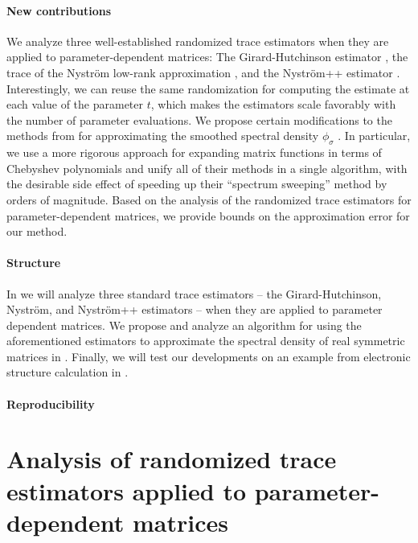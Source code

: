 \documentclass[12pt]{article}
\begin{document}
\paragraph{New contributions} We analyze three well-established randomized trace estimators when they are applied to parameter-dependent matrices: The Girard-Hutchinson estimator \cite{girard-1989-fast-montecarlo, hutchinson-1990-stochastic-estimator}, the trace of the Nyström low-rank approximation \cite{gittens-2013-revisiting-nystrom}, and the Nyström++ estimator \cite{persson-2022-improved-variants}. Interestingly, we can reuse the same randomization for computing the estimate at each value of the parameter $t$, which makes the estimators scale favorably with the number of parameter evaluations. We propose certain modifications to the methods from \cite{lin-2017-randomized-estimation} for approximating the smoothed spectral density $\phi_{\sigma}$ . In particular, we use a more rigorous approach for expanding matrix functions in terms of Chebyshev polynomials and unify all of their methods in a single algorithm, with the desirable side effect of speeding up their \enquote{spectrum sweeping} method by orders of magnitude. Based on the analysis of the randomized trace estimators for parameter-dependent matrices, we provide bounds on the approximation error for our method.

\paragraph{Structure} In  we will analyze three standard trace estimators -- the Girard-Hutchinson, Nyström, and Nyström++ estimators -- when they are applied to parameter dependent matrices. We propose and analyze an algorithm for using the aforementioned estimators to approximate the spectral density of real symmetric matrices in . Finally, we will test our developments on an example from electronic structure calculation in .

\paragraph{Reproducibility} 

\section{Analysis of randomized trace estimators applied to parameter-dependent matrices}
\label{sec:analysis}
\end{document}
